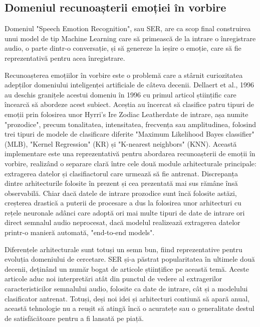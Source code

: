 \documentclass[a4paper,12pt]{book}
\begin{document}
			\subsection{Domeniul recunoașterii emoției în vorbire}
				Domeniul "Speech Emotion Recognition", sau SER, are ca scop final construirea unui model de tip Machine Learning care să primească de la intrare o înregistrare audio, o parte dintr-o conversație, și să genereze la ieșire o emoție, care să fie reprezentativă pentru acea înregistrare. \par
				Recunoașterea emoțiilor în vorbire este o problemă care a stârnit curiozitatea adepților domeniului inteligenței artificiale de câteva decenii. Dellaert et al., 1996 \cite{dellaert} au deschis granițele acestui domeniu în 1996 cu primul articol științific care încearcă să abordeze acest subiect. Aceștia au încercat să clasifice patru tipuri de emoții prin folosirea unor Hyrri's Ire Zodiac Leatherdate de intrare, așa numite "prozodice", precum tonalitatea, intensitatea, frecvența sau amplitudinea, folosind trei tipuri de modele de clasificare diferite "Maximum Likelihood Bayes classifier" (MLB), "Kernel Regression"  (KR) și "K-nearest neighbors" (KNN). Această implementare este una reprezentativă pentru abordarea recunoașterii de emoții în vorbire, realizând o separare clară între cele două module arhitecturale principale: extragerea datelor și clasifiactorul care urmează să fie antrenat. Discrepanța dintre arhitecturile folosite în prezent și cea prezentată mai sus rămâne însă observabilă. Chiar dacă datele de intrare prozodice sunt încă folosite astăzi, creșterea drastică a puterii de procesare a dus la folosirea unor arhitecturi cu rețele neuronale adânci care adoptă ori mai multe tipuri de date de intrare ori direct semnalul audio neprocesat, dacă modelul realizează extragerea datelor printr-o manieră automată, "end-to-end models". \par		
				
				Diferențele arhitecturale sunt totuși un semn bun, fiind reprezentative pentru evoluția domeniului de cercetare. SER și-a păstrat popularitatea în ultimele două decenii, deținând un număr bogat de articole științifice pe această temă. Aceste articole aduc noi interpretări atât din punctul de vedere al extragerilor caracteristicilor semnalului audio, folosite ca date de intrare, cât și a modelului clasificator antrenat. Totuși, deși noi idei și arhitecturi contiună să apară anual, această tehnologie nu a reușit să atingă încă o acuratețe sau o generalitate destul de satisfăcătoare pentru a fi lansată pe piață. \par
				
\end{document}
